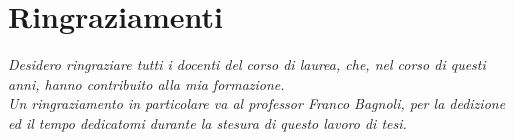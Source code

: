 \chapter*{Ringraziamenti}
\thispagestyle{empty}

\begin{flushleft}

\textit{Desidero ringraziare tutti i docenti del corso di laurea, che, nel corso di questi anni, hanno contribuito alla mia formazione. 
\medskip
\\Un ringraziamento in particolare va al professor Franco Bagnoli, per la dedizione ed il tempo dedicatomi durante la stesura di questo lavoro di tesi.}
%
%

\end{flushleft}
